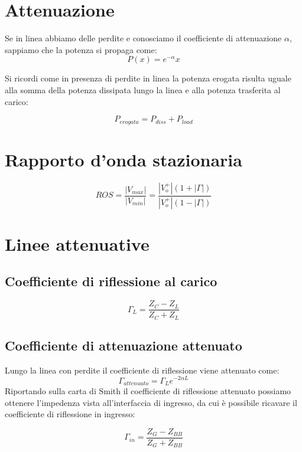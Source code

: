 \documentclass[10pt,a4paper]{report}
\begin{document}
	\section{Attenuazione}

		Se in linea abbiamo delle perdite e conosciamo il coefficiente di attenuazione $\alpha$, sappiamo che la potenza si propaga come:
		\begin{equation}
		P(x)=e^{-\alpha}x
		\end{equation}

		Si ricordi come in presenza di perdite in linea la potenza erogata risulta uguale alla somma della potenza dissipata lungo la linea e alla potenza trasferita al carico:

		\begin{equation}
		P_{erogata}=P_{diss}+P_{load}
		\end{equation}

	\section{Rapporto d'onda stazionaria}

	\begin{equation}
	ROS=\frac{|V_{max}|}{|V_{min}|}=\frac{|V_o^+|(1+|\Gamma|)}{|V_o^+|(1-|\Gamma|)}
	\end{equation}

	\section{Linee attenuative}

		\subsection{Coefficiente di riflessione al carico}

		\[
		\Gamma_L=\frac{Z_C-Z_L}{Z_C+Z_L}
		\]
		\subsection{Coefficiente di attenuazione attenuato}
		Lungo la linea con perdite il coefficiente di riflessione viene attenuato come:
		\[
		\Gamma_{attenuato}=\Gamma_L e^{-2\alpha L}
		\]
		Riportando sulla carta di Smith il coefficiente di riflessione attenuato possiamo ottenere l'impedenza vista all'interfaccia di ingresso, da cui è possibile ricavare il coefficiente di riflessione in ingresso:

		\[
		\Gamma_{in}=\frac{Z_G-Z_{BB}}{Z_G+Z_{BB}}
		\]
\end{document}
